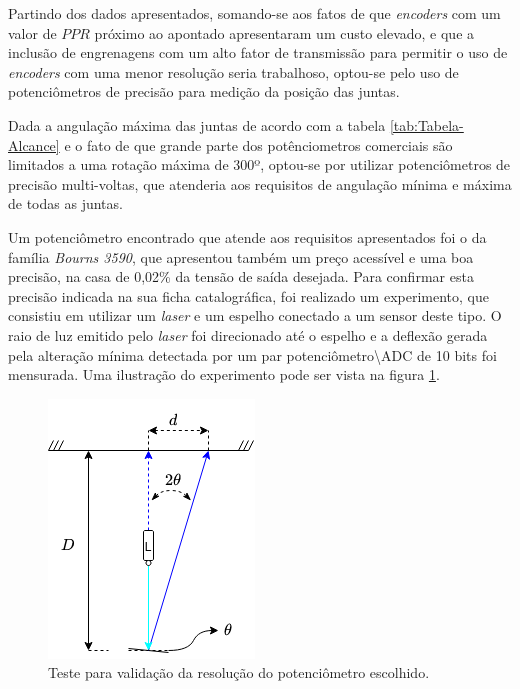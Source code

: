 Partindo dos dados apresentados, somando-se aos fatos de que \textit{encoders} com 
um valor de $PPR$ próximo ao apontado apresentaram um custo elevado, e que a 
inclusão de engrenagens com um alto fator de transmissão para permitir o uso 
de \textit{encoders} com uma menor resolução seria trabalhoso, optou-se pelo
uso de potenciômetros de precisão para medição da posição das juntas.

Dada a angulação máxima das juntas de acordo com a tabela 
\ref{tab:Tabela-Alcance} e o fato de que grande parte dos potênciometros 
comerciais são limitados a uma rotação máxima de 300º, optou-se por 
utilizar potenciômetros de precisão multi-voltas, que atenderia aos 
requisitos de angulação mínima e máxima de todas as juntas.

Um potenciômetro encontrado que atende aos requisitos apresentados foi o da 
família \textit{Bourns 3590}, que apresentou também um preço acessível e 
uma boa precisão, na casa de 0,02\% da tensão de saída desejada. Para confirmar
esta precisão indicada na sua ficha catalográfica, foi realizado um experimento, 
que consistiu em utilizar um \textit{laser} e um espelho conectado a um sensor 
deste tipo. O raio de luz emitido pelo \textit{laser} foi direcionado até o 
espelho e a deflexão gerada pela alteração mínima detectada por um par 
potenciômetro\textbackslash ADC de 10 bits foi mensurada. Uma ilustração do experimento
pode ser vista na figura \ref{fig:teste-pot}. 

\begin{figure}[h!]
    \caption{Teste para validação da resolução do potenciômetro escolhido.}    
    \begin{centering}

        \includegraphics[width=0.3\columnwidth]{images/sensors/TestePot.png}
    
    \par\end{centering}

    \label{fig:teste-pot}
\end{figure}


